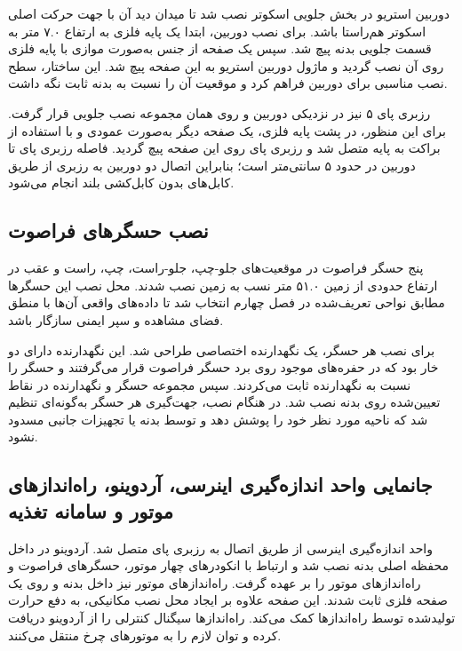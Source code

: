 دوربین استریو در بخش جلویی اسکوتر نصب شد تا میدان دید آن با جهت حرکت اصلی اسکوتر هم‌راستا باشد. برای نصب دوربین، ابتدا یک پایه فلزی به ارتفاع ۷.۰ متر به قسمت جلویی بدنه پیچ شد. سپس یک صفحه از جنس  به‌صورت موازی با پایه فلزی روی آن نصب گردید و ماژول دوربین استریو به این صفحه پیچ شد. این ساختار، سطح نصب مناسبی برای دوربین فراهم کرد و موقعیت آن را نسبت به بدنه ثابت نگه داشت.

رزبری پای ۵ نیز در نزدیکی دوربین و روی همان مجموعه نصب جلویی قرار گرفت. برای این منظور، در پشت پایه فلزی، یک صفحه  دیگر به‌صورت عمودی و با استفاده از براکت به پایه متصل شد و رزبری پای روی این صفحه پیچ گردید. فاصله رزبری پای تا دوربین در حدود ۵ سانتی‌متر است؛ بنابراین اتصال دو دوربین به رزبری از طریق کابل‌های  بدون کابل‌کشی بلند انجام می‌شود.

\subsection{نصب حسگرهای فراصوت}
\label{subsec:ultrasonic_sensor_installation}

پنج حسگر فراصوت  در موقعیت‌های جلو-چپ، جلو-راست، چپ، راست و عقب در ارتفاع حدودی از زمین ۵۱.۰ متر نسب به زمین نصب شدند. محل نصب این حسگرها مطابق نواحی تعریف‌شده در فصل چهارم انتخاب شد تا داده‌های واقعی آن‌ها با منطق فضای مشاهده و سپر ایمنی سازگار باشد.

برای نصب هر حسگر، یک نگهدارنده اختصاصی طراحی شد. این نگهدارنده دارای دو خار بود که در حفره‌های موجود روی برد حسگر فراصوت قرار می‌گرفتند و حسگر را نسبت به نگهدارنده ثابت می‌کردند. سپس مجموعه حسگر و نگهدارنده در نقاط تعیین‌شده روی بدنه نصب شد. در هنگام نصب، جهت‌گیری هر حسگر به‌گونه‌ای تنظیم شد که ناحیه مورد نظر خود را پوشش دهد و توسط بدنه یا تجهیزات جانبی مسدود نشود.

\subsection{جانمایی واحد اندازه‌گیری اینرسی، آردوینو، راه‌اندازهای موتور و سامانه تغذیه}
\label{subsec:imu_arduino_driver_power_installation}

واحد اندازه‌گیری اینرسی از طریق اتصال  به رزبری پای متصل شد. آردوینو در داخل محفظه اصلی بدنه نصب شد و ارتباط با انکودرهای چهار موتور، حسگرهای فراصوت و راه‌اندازهای موتور را بر عهده گرفت. راه‌اندازهای موتور نیز داخل بدنه و روی یک صفحه فلزی ثابت شدند. این صفحه علاوه بر ایجاد محل نصب مکانیکی، به دفع حرارت تولیدشده توسط راه‌اندازها کمک می‌کند. راه‌اندازها سیگنال کنترلی را از آردوینو دریافت کرده و توان لازم را به موتورهای چرخ منتقل می‌کنند.

